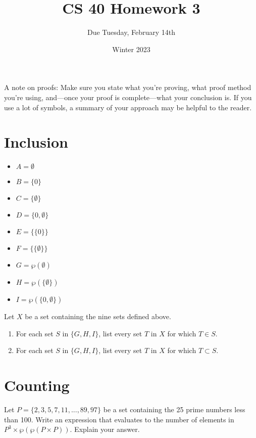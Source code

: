 \documentclass{article}
\title{CS 40 Homework 3}
\author{Due Tuesday, February 14th}
\date{Winter 2023}
\begin{document}
\maketitle

\noindent
A note on proofs:
Make sure you state what you're proving, what proof method you're using, and---once your proof is complete---what your conclusion is.
If you use a lot of symbols, a summary of your approach may be helpful to the reader.

\section{Inclusion}

\begin{multicols}{3}
\begin{itemize}
    \item $A = \emptyset$
    \item $B = \{0\}$
    \item $C = \{\emptyset\}$
    \item $D = \{0, \emptyset\}$
    \item $E = \{\{0\}\}$
    \item $F = \{\{\emptyset\}\}$
    \item $G = \wp(\emptyset)$
    \item $H = \wp(\{\emptyset\})$
    \item $I = \wp(\{0, \emptyset\})$
\end{itemize}
\end{multicols}

\noindent
Let $X$ be a set containing the nine sets defined above.

\begin{enumerate}[label=\textbf{\alph*.}]
    \item For each set $S$ in $\{G, H, I\}$, list every set $T$ in $X$ for which $T \in S$.
    \item For each set $S$ in $\{G, H, I\}$, list every set $T$ in $X$ for which $T \subset S$.
\end{enumerate}


\section{Counting}

Let $P = \{2, 3, 5, 7, 11, ..., 89, 97\}$ be a set containing the 25 prime numbers less than 100.
Write an expression that evaluates to the number of elements in $P^3 \times \wp(\wp(P \times P))$.
Explain your answer.
\end{document}
